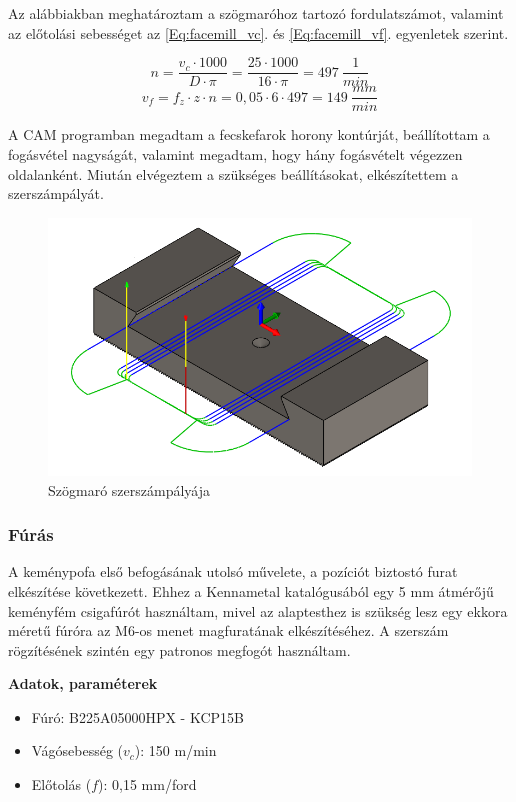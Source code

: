 \documentclass[12pt,a4paper,oneside]{report}
\begin{document}
Az alábbiakban meghatároztam a szögmaróhoz tartozó fordulatszámot, valamint az előtolási sebességet az \ref{Eq:facemill_vc}. és \ref{Eq:facemill_vf}. egyenletek szerint.

\begin{equation*}
    n=\dfrac{v_c\cdot1000}{D\cdot\pi}=\dfrac{25\cdot1000}{16\cdot\pi}=497\ \dfrac{1}{min}
\end{equation*}
\begin{equation*}
    v_f=f_z\cdot z\cdot n=0,05\cdot6\cdot497=149\ \dfrac{mm}{min}
\end{equation*}

A CAM programban megadtam a fecskefarok horony kontúrját, beállítottam a fogásvétel nagyságát, valamint megadtam, hogy hány fogásvételt végezzen oldalanként. Miután elvégeztem a szükséges beállításokat, elkészítettem a szerszámpályát.

\begin{figure}[H]
    \centering
    \includegraphics[width=12.5cm]{figures/kemenypofa_dovetail_3.png}
    \caption{Szögmaró szerszámpályája}
    \label{Fig:kemenypofa_dovetail_3}
\end{figure}

\subsubsection{Fúrás}
A keménypofa első befogásának utolsó művelete, a pozíciót biztostó furat elkészítése következett. Ehhez a Kennametal katalógusából egy 5 mm átmérőjű keményfém csigafúrót használtam, mivel az alaptesthez is szükség lesz egy ekkora méretű fúróra az M6-os menet magfuratának elkészítéséhez. A szerszám rögzítésének szintén egy patronos megfogót használtam.

\textbf{Adatok, paraméterek}
\begin{itemize}
    \item Fúró: B225A05000HPX - KCP15B
    \item Vágósebesség ($v_c$): 150 m/min
    \item Előtolás ($f$): 0,15 mm/ford
\end{itemize}
\end{document}
